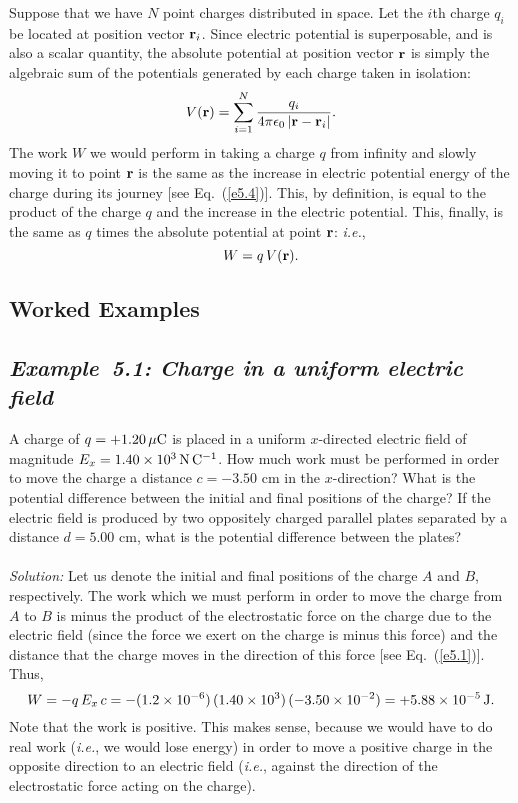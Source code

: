 Suppose that we have $N$ point charges distributed in space. Let the
$i$th charge $q_i$ be located at position vector ${\bf r}_i$. Since
electric potential is superposable, and is also a scalar quantity, the
absolute potential at position vector ${\bf r}$ is simply the
algebraic sum of the potentials generated by each charge taken in
isolation:
\begin{equation}
V({\bf r}) = \sum_{i=1}^N \frac{q_i}{4\pi\epsilon_0\,|{\bf r} - {\bf r}_i|}.
\end{equation}
The work $W$ we would perform in taking a charge $q$ from infinity and slowly moving
it to point ${\bf r}$ is the same as  the increase in electric potential
energy of the charge during its journey [see Eq.~(\ref{e5.4})]. This,
by definition, is equal to the product of the charge $q$ and the increase in
the electric potential. This, finally, is the same as $q$ times the
absolute potential at point ${\bf r}$: {\em i.e.}, 
\begin{equation}
W = q\,V({\bf r}).
\end{equation}

\subsection{Worked Examples}
\subsection*{\em Example~5.1: Charge in a uniform electric field}
 A charge of $q=+1.20\,\mu{\rm C}$ is placed in a
uniform $x$-directed electric field of magnitude $E_x=1.40\times 10^3\,{\rm N\,C^{-1}}$.
How much work must be performed in order to move the charge a distance $c=-3.50$ cm in the
$x$-direction? What is the potential difference between the initial and final positions
of the charge? If the electric field is produced by two oppositely 
charged parallel plates
separated by a distance $d=5.00$ cm, what is the potential difference between the
plates?\\
~\\
{\em Solution:} Let us denote the initial and final positions of the charge
$A$ and $B$, respectively. The work which we must perform in order to move the
charge from $A$ to $B$ is minus the product of the electrostatic force on the
charge due to the electric field 
(since the force we exert on the charge is minus this force)
and the distance that the charge moves in the
direction of this force [see Eq.~(\ref{e5.1})]. Thus,
$$
W = -q \,E_x\, c= -(1.2\times 10^{-6})\,(1.40\times 10^3)\,(-3.50\times 10^{-2}) =
+5.88 \times 10^{-5}\,{\rm J}.
$$
Note that the work is positive. This makes sense, because we would have to do real
work ({\em i.e.}, we would lose energy) in order to move a positive charge in the opposite direction
to an electric field ({\em i.e.}, against the direction of the electrostatic
force acting on the charge).


